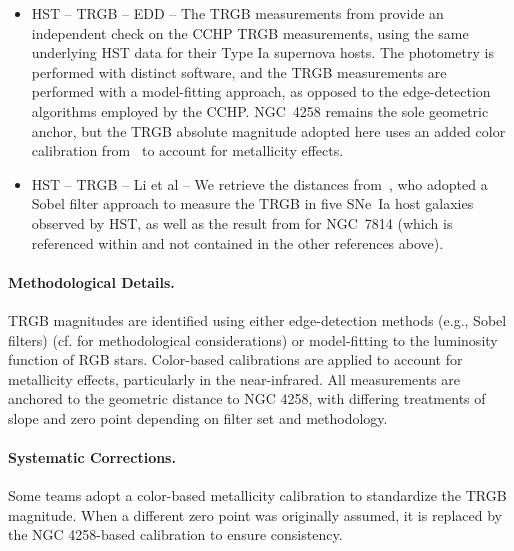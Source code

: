 \begin{itemize}
    GO-13691~\citep{2014hst..prop13691F}, 
    GO-15642~\citep{2018hst..prop15642F},
    GO-9351~\citep{2002hst..prop.9351R},
    GO-10497~\citep{2005hst..prop10497R}, and
    GO-10802~\citep{2006hst..prop10802R}.
For the baseline, we elect to use a single geometric anchor, NGC\,4258, for which we take the calibration from~\citet{2021ApJ...906..125J} that assumes no color-term and adopts ${M}_{{\rm{F}}814{\rm{W}}}^{{\rm{TRGB}}}=-4.050\pm 0.028$ (stat) $\pm$ 0.048 (sys) mag.
Thus, where needed we remove the TRGB zero point used in the respective paper and then adopt the NGC\,4258 result. 
\item HST -- TRGB -- EDD -- 
The TRGB measurements from \citet{2022ApJ...932...15A} provide an independent check on the CCHP TRGB measurements, using the same underlying HST data for their Type Ia supernova hosts. The photometry is performed with distinct software, and the TRGB measurements are performed with a model-fitting approach, as opposed to the edge-detection algorithms employed by the CCHP. NGC~4258 remains the sole geometric anchor, but the TRGB absolute magnitude adopted here uses an added color calibration from~\citet{2007ApJ...661..815R} to account for metallicity effects.
\item HST -- TRGB -- Li et al -- We retrieve the distances from~\citet{2025arXiv250408921L}, who adopted a Sobel filter approach to measure the TRGB in five SNe~Ia host galaxies observed by HST, as well as the result from \citet{2022ApJ...934..185D} for NGC~7814 (which is referenced within \citet{2025arXiv250408921L} and not contained in the other references above).
\end{itemize}

\paragraph{Methodological Details.}
TRGB magnitudes are identified using either edge-detection methods (e.g., Sobel filters) (cf. \citealt{2024ApJ...963L..43A} for methodological considerations) or model-fitting to the luminosity function of RGB stars. Color-based calibrations are applied to account for metallicity effects, particularly in the near-infrared. All measurements are anchored to the geometric distance to NGC 4258, with differing treatments of slope and zero point depending on filter set and methodology.

\paragraph{Systematic Corrections.}
Some teams adopt a color-based metallicity calibration to standardize the TRGB magnitude. When a different zero point was originally assumed, it is replaced by the NGC 4258-based calibration to ensure consistency.

